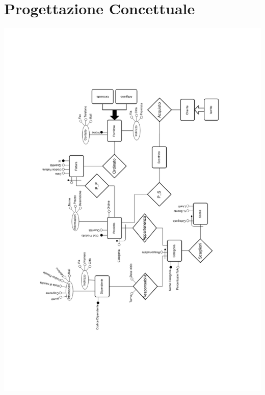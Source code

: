 \section{Progettazione Concettuale}

%


\includegraphics[scale=0.7]{include/progettazioneConcettuale/schemaER/BasiSchemaER}


